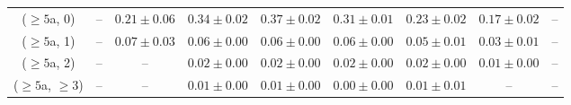 \begin{table}[h!]
{\begin{tabular}{ccccccccc}
	($\ge5$a, 0) & -- & $0.21\pm 0.06$ & $0.34\pm 0.02$ & $0.37\pm 0.02$ & $0.31\pm 0.01$ & $0.23\pm 0.02$ & $0.17\pm 0.02$ & -- \\[0.5ex] 
	($\ge5$a, 1) & -- & $0.07\pm 0.03$ & $0.06\pm 0.00$ & $0.06\pm 0.00$ & $0.06\pm 0.00$ & $0.05\pm 0.01$ & $0.03\pm 0.01$ & -- \\[0.5ex] 
	($\ge5$a, 2) & -- & -- & $0.02\pm 0.00$ & $0.02\pm 0.00$ & $0.02\pm 0.00$ & $0.02\pm 0.00$ & $0.01\pm 0.00$ & -- \\[0.5ex] 
	($\ge5$a, $\ge3$) & -- & -- & $0.01\pm 0.00$ & $0.01\pm 0.00$ & $0.00\pm 0.00$ & $0.01\pm 0.01$ & -- & -- \\[0.5ex] 
	\hline
	\hline
\end{tabular}}
\end{table}
